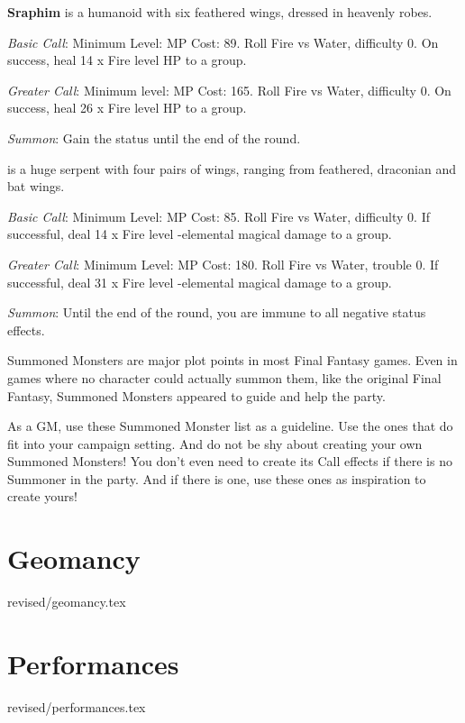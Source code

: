 \begin{multicols}{2}
    \textbf{Sraphim} is a humanoid with six feathered wings, dressed in heavenly robes.
    
    \textit{Basic Call}: Minimum Level:  MP Cost: 89. Roll Fire vs Water, difficulty 0. On success, heal 14 x Fire level HP to a group.
    
    \textit{Greater Call}: Minimum level:  MP Cost: 165. Roll Fire vs Water, difficulty 0. On success, heal 26 x Fire level HP to a group.
    
    \textit{Summon}: Gain the  status until the end of the round.
    
     is a huge serpent with four pairs of wings, ranging from feathered, draconian and bat wings.
    
    \textit{Basic Call}: Minimum Level:  MP Cost: 85. Roll Fire vs Water, difficulty 0. If successful, deal 14 x Fire level -elemental magical damage to a group.
    
    \textit{Greater Call}: Minimum Level:  MP Cost: 180. Roll Fire vs Water, trouble 0. If successful, deal 31 x Fire level -elemental magical damage to a group.
    
    \textit{Summon}: Until the end of the round, you are immune to all negative status effects.

\begin{mog}
    \baselineskip=13pt
    Summoned Monsters are major plot points in most Final Fantasy games. Even in games where no character could actually summon them, like the original Final Fantasy, Summoned Monsters appeared to guide and help the party. \pc%

    As a GM, use these Summoned Monster list as a guideline. Use the ones that do fit into your campaign setting. And do not be shy about creating your own Summoned Monsters! You don't even need to create its Call effects if there is no Summoner in the party. And if there is one, use these ones as inspiration to create yours!
\end{mog}

\end{multicols}

\section{Geomancy}\label{sec:magic-geomancy}
 {revised/geomancy.tex}

\section{Performances}\label{sec:magic-performances}
 {revised/performances.tex}
